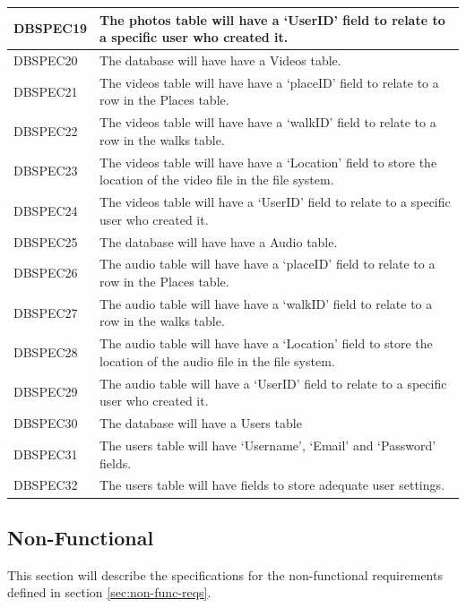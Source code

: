 \documentclass[11pt,a4paper]{article}
\begin{document}
\begin{longtable}{|p{2.5cm}p{13cm}|}
DBSPEC19 & The photos table will have a `UserID' field to relate to a specific user who created it. \\\hline
DBSPEC20 & The database will have have a Videos table. \\ \hline
DBSPEC21 & The videos table will have have a `placeID' field to relate to a row in the Places table. \\ \hline
DBSPEC22 & The videos table will have have a `walkID' field to relate to a row in the walks table.\\ \hline
DBSPEC23 & The videos table will have have a `Location' field to store the location of the video file in the file system.\\ \hline
DBSPEC24 & The videos table will have a `UserID' field to relate to a specific user who created it. \\\hline
DBSPEC25 & The database will have have a Audio table. \\ \hline
DBSPEC26 & The audio table will have have a `placeID' field to relate to a row in the Places table. \\ \hline
DBSPEC27 & The audio table will have have a `walkID' field to relate to a row in the walks table.\\ \hline
DBSPEC28 & The audio table will have have a `Location' field to store the location of the audio file in the file system.\\ \hline
DBSPEC29 & The audio table will have a `UserID' field to relate to a specific user who created it. \\\hline
DBSPEC30 & The database will have a  Users table \\ \hline
DBSPEC31 & The users table will have `Username', `Email' and `Password' fields.\\ \hline
DBSPEC32 & The users table will have fields to store adequate user settings. \\ \hline



\end{longtable}

\subsection{Non-Functional}
\label{sec:non-func-specs}

This section will describe the specifications for the non-functional requirements defined in section \ref{sec:non-func-reqs}.
\end{document}
